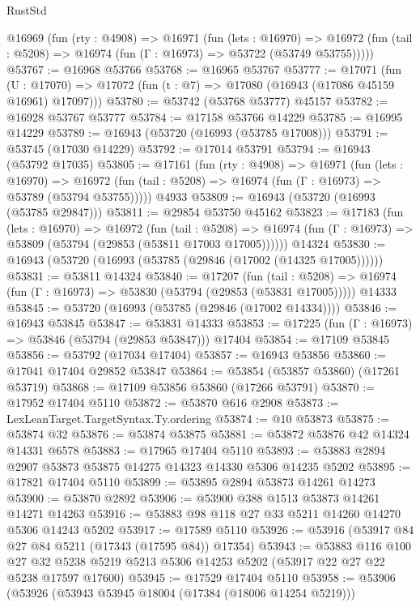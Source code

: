 \begin{lexlean}{RustStd}
\begin{coremodule}
  @16969
    (fun (rty : @4908) =>
    @16971
      (fun (lets : @16970) =>
      @16972 (fun (tail : @5208) => @16974 (fun (Γ : @16973) => @53722 (@53749 @53755)))))
@53767 := @16968 @53766
@53768 := @16965 @53767
@53777 := @17071
    (fun (U : @17070) => @17072 (fun (t : @7) => @17080 (@16943 (@17086 @45159 @16961) @17097)))
@53780 := @53742 (@53768 @53777) @45157
@53782 := @16928 @53767 @53777
@53784 := @17158 @53766 @14229
@53785 := @16995 @14229
@53789 := @16943 (@53720 (@16993 (@53785 @17008)))
@53791 := @53745 (@17030 @14229)
@53792 := @17014 @53791
@53794 := @16943 (@53792 @17035)
@53805 := @17161
    (fun (rty : @4908) =>
    @16971
      (fun (lets : @16970) =>
      @16972 (fun (tail : @5208) => @16974 (fun (Γ : @16973) => @53789 (@53794 @53755)))))
    @4933
@53809 := @16943 (@53720 (@16993 (@53785 @29847)))
@53811 := @29854 @53750 @45162
@53823 := @17183
    (fun (lets : @16970) =>
    @16972
      (fun (tail : @5208) =>
      @16974 (fun (Γ : @16973) => @53809 (@53794 (@29853 (@53811 @17003 @17005))))))
    @14324
@53830 := @16943 (@53720 (@16993 (@53785 (@29846 (@17002 (@14325 @17005))))))
@53831 := @53811 @14324
@53840 := @17207
    (fun (tail : @5208) => @16974 (fun (Γ : @16973) => @53830 (@53794 (@29853 (@53831 @17005)))))
    @14333
@53845 := @53720 (@16993 (@53785 (@29846 (@17002 @14334))))
@53846 := @16943 @53845
@53847 := @53831 @14333
@53853 := @17225 (fun (Γ : @16973) => @53846 (@53794 (@29853 @53847))) @17404
@53854 := @17109 @53845
@53856 := @53792 (@17034 @17404)
@53857 := @16943 @53856
@53860 := @17041 @17404 @29852 @53847
@53864 := @53854 (@53857 @53860) (@17261 @53719)
@53868 := @17109 @53856 @53860 (@17266 @53791)
@53870 := @17952 @17404 @5110
@53872 := @53870 @616 @2908
@53873 := LexLeanTarget.TargetSyntax.Ty.ordering
@53874 := @10 @53873
@53875 := @53874 @32
@53876 := @53874 @53875
@53881 := @53872 @53876 @42 @14324 @14331 @6578
@53883 := @17965 @17404 @5110
@53893 := @53883 @2894 @2907 @53873 @53875 @14275 @14323 @14330 @5306 @14235 @5202
@53895 := @17821 @17404 @5110
@53899 := @53895 @2894 @53873 @14261 @14273
@53900 := @53870 @2892
@53906 := @53900 @388 @1513 @53873 @14261 @14271 @14263
@53916 := @53883 @98 @118 @27 @33 @5211 @14260 @14270 @5306 @14243 @5202
@53917 := @17589 @5110
@53926 := @53916 (@53917 @84 @27 @84 @5211 (@17343 (@17595 @84)) @17354)
@53943 := @53883
    @116
    @100
    @27
    @32
    @5238
    @5219
    @5213
    @5306
    @14253
    @5202
    (@53917 @22 @27 @22 @5238 @17597 @17600)
@53945 := @17529 @17404 @5110
@53958 := @53906
    (@53926
      (@53943 @53945 @18004 (@17384 (@18006 @14254 @5219)))

\end{coremodule}
\end{lexlean}
